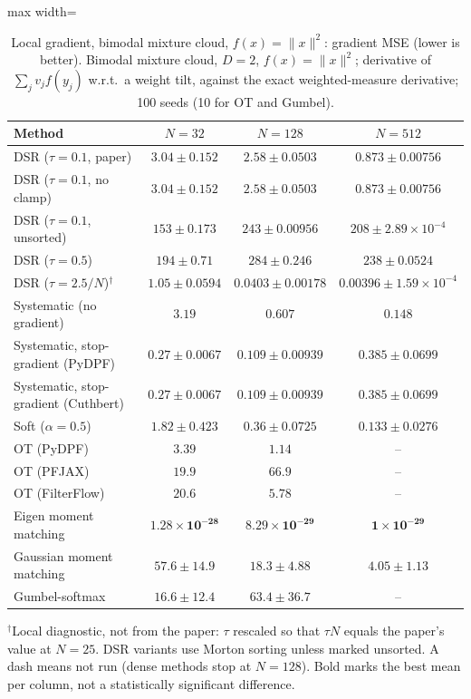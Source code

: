 \begin{table}[H]
\centering
\small
\caption{Local gradient, bimodal mixture cloud, $f(x)=\|x\|^2$: gradient MSE (lower is better). Bimodal mixture cloud, $D{=}2$, $f(x)=\|x\|^2$; derivative of $\sum_j v_j f(y_j)$ w.r.t.\ a weight tilt, against the exact weighted-measure derivative; 100 seeds (10 for OT and Gumbel).}
\label{tab:grad-mixture-x2-squared_error_mean}
\begin{adjustbox}{max width=\linewidth}
\begin{tabular}{lccc}
\toprule
Method & $N{=}32$ & $N{=}128$ & $N{=}512$ \\
\midrule
DSR ($\tau{=}0.1$, paper) & $3.04\pm0.152$ & $2.58\pm0.0503$ & $0.873\pm0.00756$ \\
DSR ($\tau{=}0.1$, no clamp) & $3.04\pm0.152$ & $2.58\pm0.0503$ & $0.873\pm0.00756$ \\
DSR ($\tau{=}0.1$, unsorted) & $153\pm0.173$ & $243\pm0.00956$ & $208\pm2.89\times10^{-4}$ \\
DSR ($\tau{=}0.5$) & $194\pm0.71$ & $284\pm0.246$ & $238\pm0.0524$ \\
DSR ($\tau{=}2.5/N$)$^\dagger$ & $1.05\pm0.0594$ & $0.0403\pm0.00178$ & $0.00396\pm1.59\times10^{-4}$ \\
\midrule
Systematic (no gradient) & $3.19$ & $0.607$ & $0.148$ \\
Systematic, stop-gradient (PyDPF) & $0.27\pm0.0067$ & $0.109\pm0.00939$ & $0.385\pm0.0699$ \\
Systematic, stop-gradient (Cuthbert) & $0.27\pm0.0067$ & $0.109\pm0.00939$ & $0.385\pm0.0699$ \\
Soft ($\alpha{=}0.5$) & $1.82\pm0.423$ & $0.36\pm0.0725$ & $0.133\pm0.0276$ \\
OT (PyDPF) & $3.39$ & $1.14$ & -- \\
OT (PFJAX) & $19.9$ & $66.9$ & -- \\
OT (FilterFlow) & $20.6$ & $5.78$ & -- \\
Eigen moment matching & $\mathbf{1.28\times10^{-28}}$ & $\mathbf{8.29\times10^{-29}}$ & $\mathbf{1\times10^{-29}}$ \\
Gaussian moment matching & $57.6\pm14.9$ & $18.3\pm4.88$ & $4.05\pm1.13$ \\
Gumbel-softmax & $16.6\pm12.4$ & $63.4\pm36.7$ & -- \\
\bottomrule
\end{tabular}
\end{adjustbox}
\par\smallskip\parbox{0.95\linewidth}{\footnotesize $^\dagger$Local diagnostic, not from the paper: $\tau$ rescaled so that $\tau N$ equals the paper's value at $N{=}25$. DSR variants use Morton sorting unless marked unsorted. A dash means not run (dense methods stop at $N{=}128$). Bold marks the best mean per column, not a statistically significant difference.}
\end{table}


